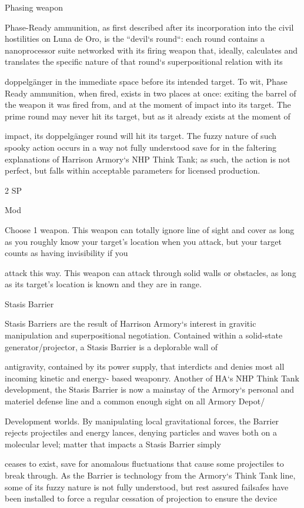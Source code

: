 Phasing weapon

Phase-Ready ammunition, as first described after its incorporation into the civil hostilities on Luna de Oro,
is the “devil‘s round“: each round contains a nanoprocessor suite networked with its firing weapon that,
ideally, calculates and translates the specific nature of that round‘s superpositional relation with its

doppelgänger in the immediate space before its intended target. To wit, Phase Ready ammunition, when
fired, exists in two places at once: exiting the barrel of the weapon it was fired from, and at the moment of
impact into its target. The prime round may never hit its target, but as it already exists at the moment of

impact, its doppelgänger round will hit its target. The fuzzy nature of such spooky action occurs in a way
not fully understood save for in the faltering explanations of Harrison Armory‘s NHP Think Tank; as such,
the action is not perfect, but falls within acceptable parameters for licensed production.

2 SP

Mod

Choose 1 weapon. This weapon can totally ignore line of sight and cover as long as you roughly
know your target’s location when you attack, but your target counts as having invisibility if you




attack this way. This weapon can attack through solid walls or obstacles, as long as its target’s
location is known and they are in range.


Stasis Barrier

Stasis Barriers are the result of Harrison Armory‘s interest in gravitic manipulation and superpositional
negotiation. Contained within a solid-state generator/projector, a Stasis Barrier is a deplorable wall of

antigravity, contained by its power supply, that interdicts and denies most all incoming kinetic and energy-
based weaponry. Another of HA‘s NHP Think Tank development, the Stasis Barrier is now a mainstay of the
Armory‘s personal and materiel defense line and a common enough sight on all Armory Depot/

Development worlds. By manipulating local gravitational forces, the Barrier rejects projectiles and energy
lances, denying particles and waves both on a molecular level; matter that impacts a Stasis Barrier simply

ceases to exist, save for anomalous fluctuations that cause some projectiles to break through. As the
Barrier is technology from the Armory‘s Think Tank line, some of its fuzzy nature is not fully understood, but
rest assured failsafes have been installed to force a regular cessation of projection to ensure the device

